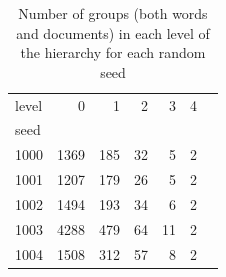 \begin{table}[tb]
\caption[Number of groups per level and seed]{Number of groups (both words and documents) in each level of the hierarchy for each random seed}
\label{tab:levels}
\begin{tabular}{l|rrrrrr}
\toprule
level & 0 & 1 & 2 & 3 & 4 \\
seed &  &  &  &  &  \\
\midrule
1000 & 1369 & 185 & 32 & 5 & 2 \\
1001 & 1207 & 179 & 26 & 5 & 2 \\
1002 & 1494 & 193 & 34 & 6 & 2 \\
1003 & 4288 & 479 & 64 & 11 & 2 \\
1004 & 1508 & 312 & 57 & 8 & 2 \\
\bottomrule
\end{tabular}
\end{table}
